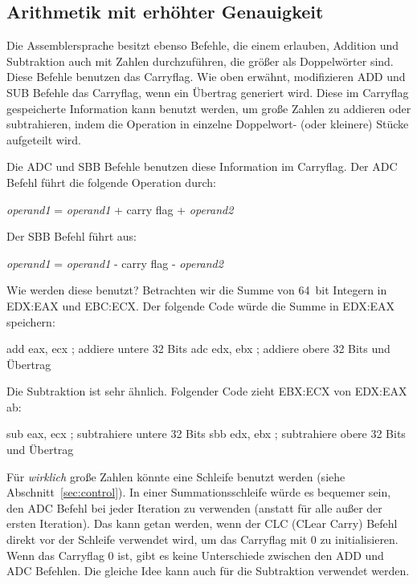 \subsection{Arithmetik mit erh\"{o}hter Genauigkeit \label{sec:ExtPrecArith}
}

Die Assemblersprache besitzt ebenso Befehle, die einem erlauben,
Addition und Subtraktion auch mit Zahlen durchzuf\"{u}hren, die gr\"{o}{\ss}er
als Doppelw\"{o}rter sind. Diese Befehle benutzen das Carryflag. Wie
oben erw\"{a}hnt, modifizieren {\code ADD} 
und {\code SUB}  Befehle das Carryflag,
wenn ein \"{U}bertrag generiert wird. Diese im Carryflag gespeicherte
Information kann benutzt werden, um gro{\ss}e Zahlen zu addieren oder
subtrahieren, indem die Operation in einzelne Doppelwort- (oder
kleinere) St\"{u}cke aufgeteilt wird.

Die {\code ADC}  und {\code SBB}
 Befehle benutzen diese Information im
Carryflag. Der {\code ADC} Befehl f\"{u}hrt die folgende Operation
durch:
\begin{center}
{\code \emph{operand1} = \emph{operand1} + carry flag + \emph{operand2} }
\end{center}
Der {\code SBB} Befehl f\"{u}hrt aus:
\begin{center}
{\code \emph{operand1} = \emph{operand1} - carry flag - \emph{operand2} }
\end{center}
Wie werden diese benutzt? Betrachten wir die Summe von 64~bit
Integern in EDX:EAX  und EBC:ECX\@. Der
folgende Code w\"{u}rde die Summe in EDX:EAX speichern:
\begin{AsmCodeListing}[frame=none, numbers=left, commandchars=\\\{\}]
      add    eax, ecx         ; addiere untere 32 Bits
      adc    edx, ebx         ; addiere obere 32 Bits und \"{U}bertrag
\end{AsmCodeListing}
Die Subtraktion ist sehr \"{a}hnlich. Folgender Code zieht EBX:ECX von
EDX:EAX ab:
\begin{AsmCodeListing}[frame=none, numbers=left, firstnumber=last, commandchars=\\\{\}]
      sub    eax, ecx         ; subtrahiere untere 32 Bits
      sbb    edx, ebx         ; subtrahiere obere 32 Bits und \"{U}bertrag
\end{AsmCodeListing}

F\"{u}r \emph{wirklich} gro{\ss}e Zahlen k\"{o}nnte eine Schleife benutzt werden
(siehe Abschnitt~\ref{sec:control}). In einer Summationsschleife
w\"{u}rde es bequemer sein, den {\code ADC} Befehl bei jeder Iteration
zu verwenden (anstatt f\"{u}r alle au{\ss}er der ersten Iteration). Das kann
getan werden, wenn der {\code CLC} 
(CLear Carry) Befehl direkt vor der Schleife verwendet wird, um das
Carryflag mit 0 zu initialisieren. Wenn das Carryflag 0 ist, gibt es
keine Unterschiede zwischen den {\code ADD} und {\code ADC}
Befehlen. Die gleiche Idee kann auch f\"{u}r die Subtraktion verwendet
werden. 

